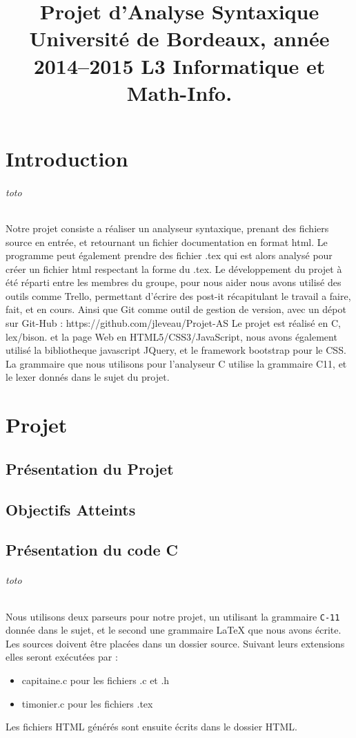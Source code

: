 \documentclass{report}
\title{Projet d’Analyse Syntaxique Université de Bordeaux, année 2014–2015 L3 Informatique et Math-Info.}
\begin{document}
\maketitle
\tableofcontents
\part{Introduction}
\paragraph{toto}{
	Notre projet consiste a réaliser un analyseur syntaxique, prenant des fichiers source en entrée, et retournant un fichier documentation en format html.
	Le programme peut également prendre des fichier .tex qui est alors analysé pour créer un fichier html respectant la forme du .tex.
	Le développement du projet à été réparti entre les membres du groupe, pour nous aider nous avons utilisé des outils comme Trello, permettant d'écrire des 
	post-it récapitulant le travail a faire, fait, et en cours. Ainsi que Git comme outil de gestion de version, avec un dépot sur Git-Hub : https://github.com/jleveau/Projet-AS
	Le projet est réalisé en C, lex/bison. et la page Web en HTML5/CSS3/JavaScript, nous avons également utilisé la bibliotheque javascript JQuery, et le framework bootstrap
	pour le CSS.
	La grammaire que nous utilisons pour l'analyseur C utilise la grammaire C11, et le lexer donnés dans le sujet du projet.
}
\part{Projet}
\chapter{Présentation du Projet}
\chapter{Objectifs Atteints}
\chapter{Présentation du code C}
\paragraph{toto}{Nous utilisons deux parseurs pour notre projet, un utilisant la grammaire \texttt{C-11} donnée dans le sujet, et le second une grammaire LaTeX que nous avons écrite.
	Les sources doivent être placées dans un dossier source. Suivant leurs extensions elles seront exécutées par :
	\begin{itemize}
	\item capitaine.c pour les fichiers .c et .h
	\item timonier.c pour les fichiers .tex
	\end{itemize}
	Les fichiers HTML générés sont ensuite écrits dans le dossier HTML.
}
\end{document}
